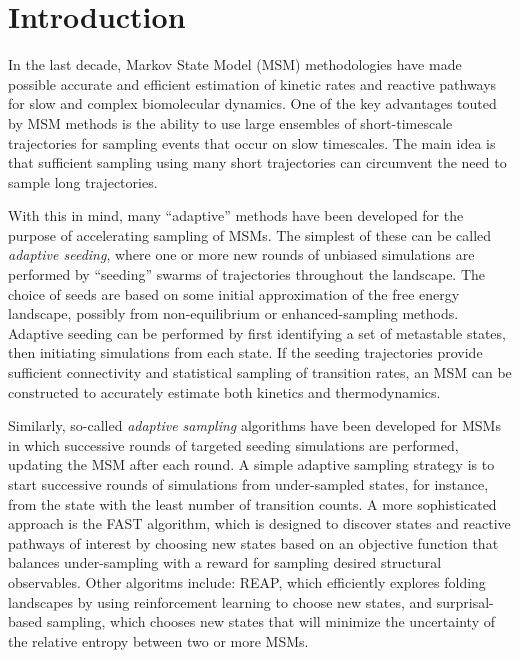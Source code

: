 \documentclass[%
 aip,
rsi,%
 amsmath,amssymb,
 reprint,%
]{revtex4-1}
\begin{document}

\section*{Introduction}
In the last decade, Markov State Model (MSM) methodologies have made possible accurate and efficient estimation of kinetic rates and reactive pathways for slow and complex biomolecular dynamics.\cite{Noe:2009en,Voelz:2010hs,Prinz:2011id,Chodera:2014gk,noe2014introduction} One of the key advantages touted by MSM methods is the ability to use large ensembles of short-timescale trajectories for sampling events that occur on slow timescales.  The main idea is that sufficient sampling using many short trajectories can circumvent the need to sample long trajectories.

With this in mind, many ``adaptive'' methods have been developed for the purpose of accelerating sampling of MSMs.  The simplest of these can be called \textit{adaptive seeding}, where one or more new rounds of unbiased simulations are performed by ``seeding'' swarms of trajectories throughout the landscape.\cite{Huang:2009bx} The choice of seeds are based on some initial approximation of the free energy landscape, possibly from non-equilibrium or enhanced-sampling methods.  Adaptive seeding can be performed by first identifying a set of metastable states, then initiating simulations from each state.  If the seeding trajectories provide sufficient connectivity and statistical sampling of transition rates, an MSM can be constructed to accurately estimate both kinetics and thermodynamics.  
 
Similarly, so-called \textit{adaptive sampling} algorithms have been developed for MSMs in which successive rounds of targeted seeding simulations are performed, updating the MSM after each round.\cite{Voelz:2014kk,Shamsi:2017jg} A simple adaptive sampling strategy is to start successive rounds of simulations from under-sampled states, for instance, from the state with the least number of transition counts.\cite{Doerr:2014fc}  A more sophisticated approach is the FAST algorithm, which is designed to discover states and reactive pathways of interest by choosing new states based on an objective function that balances under-sampling with a reward for sampling desired structural observables.\cite{Zimmerman:2015kf,Zimmerman:2018jn} Other algoritms include: REAP, which efficiently explores folding landscapes by using reinforcement learning to choose new states,\cite{shamsi2017reinforcement} and surprisal-based sampling,\cite{Voelz:2014kk} which chooses new states that will minimize the uncertainty of the relative entropy between two or more MSMs.
\end{document}
